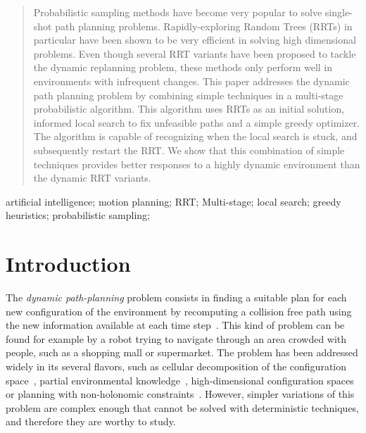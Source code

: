 \documentclass[10pt, conference, compsoc]{IEEEtran}
\begin{document}




\maketitle


\begin{abstract}
Probabilistic sampling methods have become very popular to solve single-shot
path planning problems. Rapidly-exploring Random Trees (RRTs) in particular have
been shown to be very efficient in solving high dimensional problems.
Even though several RRT variants have been proposed to tackle the dynamic
replanning problem, these methods only perform well in
environments with infrequent changes.
This paper addresses the dynamic path planning problem by combining simple
techniques in a multi-stage probabilistic algorithm. This algorithm uses
RRTs as an initial solution, informed local search to fix unfeasible paths
and a simple greedy optimizer. The algorithm is capable of recognizing when
the local search is stuck, and subsequently restart the RRT.
We show that this combination of simple techniques provides
better responses to a highly dynamic environment than the dynamic RRT variants.
\end{abstract}

\begin{IEEEkeywords}
artificial intelligence; motion planning; RRT; Multi-stage; local search; greedy
heuristics; probabilistic sampling;

\end{IEEEkeywords}


%
\IEEEpeerreviewmaketitle

\section{Introduction}

The \emph{dynamic path-planning} problem consists in finding a suitable
plan for each new configuration of the environment by recomputing a
collision free path using the new information available at each time step~\cite{Hwang92}.
This kind of problem can be found for example by a robot trying to navigate
through an area crowded with people, such as a shopping mall or supermarket.
The problem has been addressed widely in its several flavors,
such as cellular decomposition of the configuration space~\cite{Stentz95},
partial environmental knowledge~\cite{Stentz94}, 
high-dimensional configuration spaces~\cite{Kavraki96}
or planning with non-holonomic constraints~\cite{Lavalle99}. 
However, simpler variations of this problem are complex enough that cannot be solved
with deterministic techniques, and therefore they are worthy to study.
\end{document}
